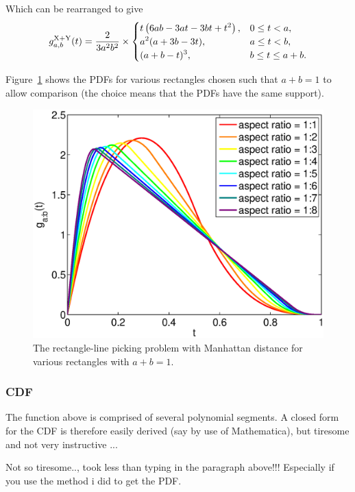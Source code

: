 Which can be rearranged to give
\begin{equation}
 g^{\rm X+Y}_{a,b}(t) = \frac{2}{3 a^2 b^2} \times 
 \begin{cases}
 \displaystyle t \left(6 a b-3 a t-3 b t+t^2\right), & 0 \le t < a, \\
 \displaystyle a^2 (a+3 b-3 t),                      & a \le t <  b, \\
 \displaystyle (a+b-t)^3,                            & b \le t \le  a + b.\\
 \end{cases}
  \label{eq:manhattan}
\end{equation}

Figure~\ref{fig:rect_man_pdf_var} shows the PDFs for various
rectangles chosen such that $a + b = 1$ to allow comparison (the
choice means that the PDFs have the same support).

\begin{figure}[htbp]
  \begin{center}
    \includegraphics[width=0.55\columnwidth]
          {../Matlab/Plots/LinePicking_plot_rect_man.eps}
    \caption{The rectangle-line picking problem with Manhattan
      distance for various rectangles with $a+b = 1$.}
    \label{fig:rect_man_pdf_var}
  \end{center} 
\vspace{-4mm}
\end{figure}

\subsubsection{CDF}

The function above is comprised of several polynomial segments. A
closed form for the CDF is therefore easily derived (say by use of
Mathematica), but tiresome and not very instructive ...

Not so tiresome.., took less than typing in the paragraph above!!!
Especially if you use the method i did to get the PDF.

